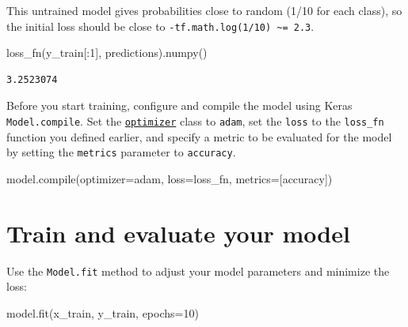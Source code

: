 \documentclass[
  letterpaper,
  DIV=11,
  numbers=noendperiod]{scrreprt}
\newenvironment{Shaded}{\begin{snugshade}}{\end{snugshade}}
\newcommand{\BuiltInTok}[1]{\textcolor[rgb]{0.00,0.23,0.31}{#1}}
\newcommand{\DecValTok}[1]{\textcolor[rgb]{0.68,0.00,0.00}{#1}}
\newcommand{\NormalTok}[1]{\textcolor[rgb]{0.00,0.23,0.31}{#1}}
\newcommand{\OperatorTok}[1]{\textcolor[rgb]{0.37,0.37,0.37}{#1}}
\newcommand{\StringTok}[1]{\textcolor[rgb]{0.13,0.47,0.30}{#1}}
\begin{document}
This untrained model gives probabilities close to random (1/10 for each
class), so the initial loss should be close to
\texttt{-tf.math.log(1/10)\ \textasciitilde{}=\ 2.3}.

\begin{Shaded}
\begin{Highlighting}[]
\NormalTok{loss\_fn(y\_train[:}\DecValTok{1}\NormalTok{], predictions).numpy()}
\end{Highlighting}
\end{Shaded}

\begin{verbatim}
3.2523074
\end{verbatim}

Before you start training, configure and compile the model using Keras
\texttt{Model.compile}. Set the
\href{https://www.tensorflow.org/api_docs/python/tf/keras/optimizers}{\texttt{optimizer}}
class to \texttt{adam}, set the \texttt{loss} to the \texttt{loss\_fn}
function you defined earlier, and specify a metric to be evaluated for
the model by setting the \texttt{metrics} parameter to
\texttt{accuracy}.

\begin{Shaded}
\begin{Highlighting}[]
\NormalTok{model.}\BuiltInTok{compile}\NormalTok{(optimizer}\OperatorTok{=}\StringTok{\textquotesingle{}adam\textquotesingle{}}\NormalTok{,}
\NormalTok{              loss}\OperatorTok{=}\NormalTok{loss\_fn,}
\NormalTok{              metrics}\OperatorTok{=}\NormalTok{[}\StringTok{\textquotesingle{}accuracy\textquotesingle{}}\NormalTok{])}
\end{Highlighting}
\end{Shaded}

\hypertarget{train-and-evaluate-your-model}{%
\section{Train and evaluate your
model}\label{train-and-evaluate-your-model}}

Use the \texttt{Model.fit} method to adjust your model parameters and
minimize the loss:

\begin{Shaded}
\begin{Highlighting}[]
\NormalTok{model.fit(x\_train, y\_train, epochs}\OperatorTok{=}\DecValTok{10}\NormalTok{)}
\end{Highlighting}
\end{Shaded}
\end{document}
